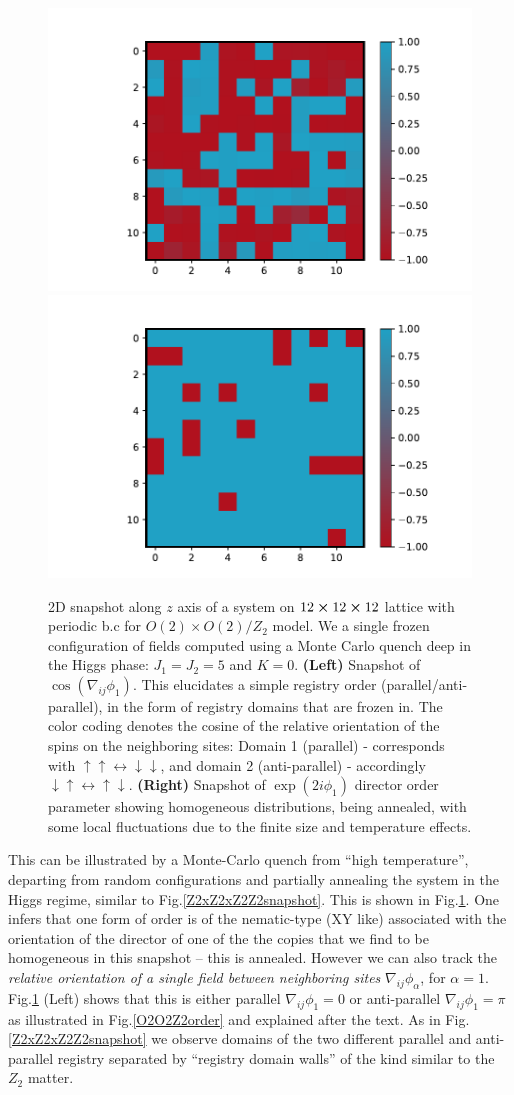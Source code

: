 \begin{figure}[!h]
	\centering
	\includegraphics[width=0.45\linewidth]{figures/chapter2/O2xO2Z2domainWallsSlice.pdf}
	\includegraphics[width=0.45\linewidth]{figures/chapter2/O2xO2Z2domainWallsNematicSlice.pdf}
	\caption{2D snapshot along $z$ axis of a system on $12\cross12\cross12$ lattice with periodic b.c for $O(2) \times O(2) / Z_2$  model. We a single frozen configuration of fields computed using a Monte Carlo quench deep in the Higgs phase: $J_1=J_2=5$ and $K=0$. \textbf{(Left)} Snapshot of $\cos(\nabla_{ij}\phi_1)$. This elucidates a simple registry order (parallel/anti-parallel), in the form of registry domains that are frozen in. The color coding denotes the cosine of the relative orientation of the spins on the neighboring sites: Domain 1 (parallel) -  corresponds with $\uparrow \uparrow \leftrightarrow \downarrow \downarrow$, and domain 2 (anti-parallel) -  accordingly  $\downarrow \uparrow \leftrightarrow \uparrow \downarrow$. \textbf{(Right)} Snapshot of $\exp(2i\phi_1)$ director order parameter showing homogeneous distributions, being annealed, with some local fluctuations due to the finite size and temperature effects.}
	\label{O2O2Z2snapshot}
\end{figure}

This can be illustrated by a Monte-Carlo quench from ``high temperature'', departing from random configurations and partially annealing the system in the Higgs regime, similar to Fig.\ref{Z2xZ2xZ2Z2snapshot}. This is shown in Fig.\ref{O2O2Z2snapshot}. One infers that one form of order is of the nematic-type (XY like)  associated with the orientation of the director of one of the the copies that we find to be homogeneous in this snapshot -- this is annealed. However we can also track the {\em relative orientation of a single field between neighboring sites} $\nabla_{ij}\phi_\alpha$, for $\alpha=1$. Fig.\ref{O2O2Z2snapshot} (Left) shows that this is either parallel $\nabla_{ij}\phi_1=0$ or anti-parallel $\nabla_{ij}\phi_1=\pi$ as illustrated in Fig.\ref{O2O2Z2order} and explained after the text. As in Fig.\ref{Z2xZ2xZ2Z2snapshot} we observe domains of the two different parallel and anti-parallel registry separated by ``registry domain walls'' of the kind similar to the $Z_2$ matter.

